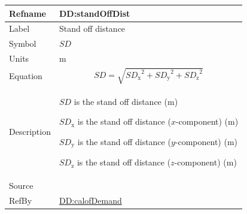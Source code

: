 \documentclass[12pt]{article}
\begin{document}
\medskip
\noindent
\begin{minipage}{\textwidth}
\begin{tabular}{>{\raggedright}p{}>{\raggedright\arraybackslash}p{}}
\toprule \textbf{Refname} & \textbf{DD:standOffDist}
\label{DD:standOffDist}
\\ \midrule
Label & Stand off distance
        
\\ \midrule
Symbol & $\mathit{SD}$
         
\\ \midrule
Units & ${\text{m}}$
        
\\ \midrule
Equation & \begin{displaymath}
           \mathit{SD}=\sqrt{{\mathit{SD}_{\text{x}}}^{2}+{\mathit{SD}_{\text{y}}}^{2}+{\mathit{SD}_{\text{z}}}^{2}}
           \end{displaymath}
\\ \midrule
Description & \begin{symbDescription}
              \item{$\mathit{SD}$ is the stand off distance (${\text{m}}$)}
              \item{${\mathit{SD}_{\text{x}}}$ is the stand off distance ($x$-component) (${\text{m}}$)}
              \item{${\mathit{SD}_{\text{y}}}$ is the stand off distance ($y$-component) (${\text{m}}$)}
              \item{${\mathit{SD}_{\text{z}}}$ is the stand off distance ($z$-component) (${\text{m}}$)}
              \end{symbDescription}
\\ \midrule
Source & \cite{astm2009}
         
\\ \midrule
RefBy & \hyperref[DD:calofDemand]{DD:calofDemand}
        
\\ \bottomrule
\end{tabular}
\end{minipage}
\end{document}
